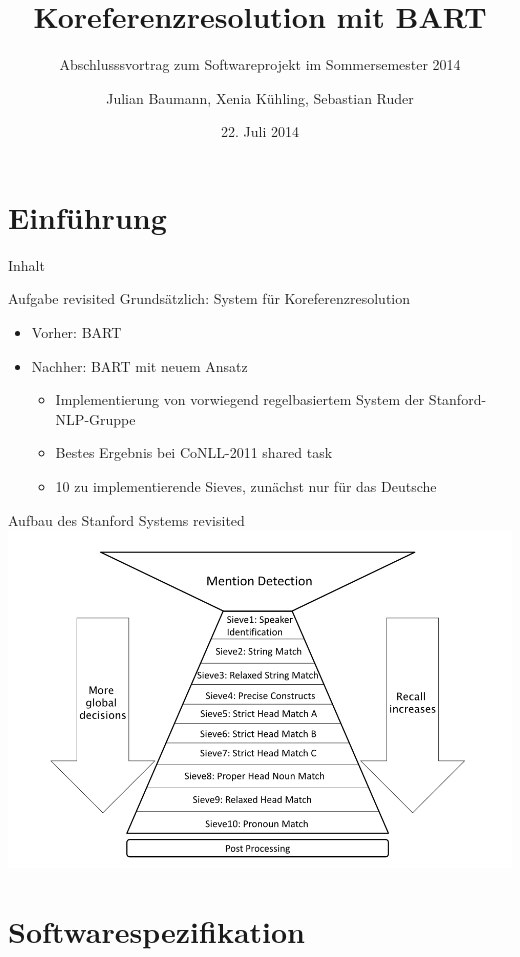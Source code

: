 \documentclass[11pt,a4paper]{beamer}
\author{Julian Baumann, Xenia Kühling, Sebastian Ruder}
\title{Koreferenzresolution mit BART}
\subtitle{Abschlusssvortrag zum Softwareprojekt im Sommersemester 2014}
\date{22. Juli 2014}
\begin{document}
\maketitle

\section{Einführung}

\begin{frame}{Inhalt}
\tableofcontents
\end{frame}

\begin{frame}{Aufgabe revisited}
Grundsätzlich: System für Koreferenzresolution
\begin{itemize}
\item Vorher: BART
\item Nachher: BART mit neuem Ansatz
\begin{itemize}
\item Implementierung von vorwiegend regelbasiertem System der Stanford-NLP-Gruppe
\item Bestes Ergebnis bei CoNLL-2011 shared task
\item 10 zu implementierende Sieves, zunächst nur für das Deutsche
\end{itemize}
\end{itemize}
\end{frame}


\begin{frame}{Aufbau des Stanford Systems revisited}
\includegraphics[scale=0.29]{stanford.png}
\end{frame}


\section{Softwarespezifikation}
\end{document}
